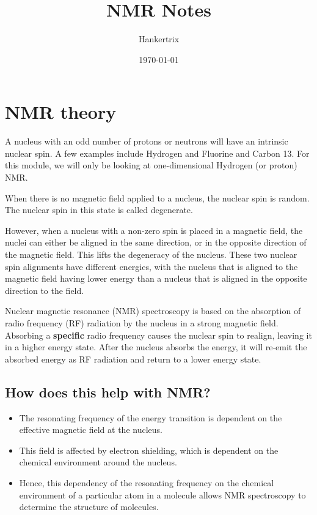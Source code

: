 \documentclass[11pt]{article}
\author{Hankertrix}
\date{\today}
\title{NMR Notes}
\begin{document}
\maketitle
\setcounter{tocdepth}{2}
\tableofcontents \clearpage\section{NMR theory}
\label{sec:org7ba62a8}
A nucleus with an odd number of protons or neutrons will have an intrinsic nuclear spin. A few examples include Hydrogen and Fluorine and Carbon 13. For this module, we will only be looking at one-dimensional Hydrogen (or proton) NMR.

When there is no magnetic field applied to a nucleus, the nuclear spin is random. The nuclear spin in this state is called degenerate.

However, when a nucleus with a non-zero spin is placed in a magnetic field, the nuclei can either be aligned in the same direction, or in the opposite direction of the magnetic field. This lifts the degeneracy of the nucleus. These two nuclear spin alignments have different energies, with the nucleus that is aligned to the magnetic field having lower energy than a nucleus that is aligned in the opposite direction to the field.

Nuclear magnetic resonance (NMR) spectroscopy is based on the absorption of radio frequency (RF) radiation by the nucleus in a strong magnetic field. Absorbing a \textbf{specific} radio frequency causes the nuclear spin to realign, leaving it in a higher energy state. After the nucleus absorbs the energy, it will re-emit the absorbed energy as RF radiation and return to a lower energy state.
\subsection{How does this help with NMR?}
\label{sec:orgc1a4a58}
\begin{itemize}
\item The resonating frequency of the energy transition is dependent on the effective magnetic field at the nucleus.
\item This field is affected by electron shielding, which is dependent on the chemical environment around the nucleus.
\item Hence, this dependency of the resonating frequency on the chemical environment of a particular atom in a molecule allows NMR spectroscopy to determine the structure of molecules.
\end{itemize}
\end{document}

